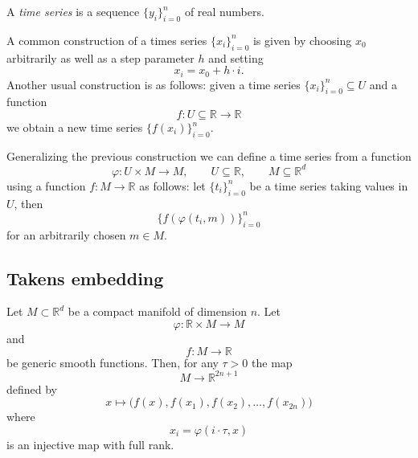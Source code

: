 \documentclass{amsart}
\begin{document}
	A \textit{time series} is a sequence $\{y_i\}_{i = 0}^n$ of real numbers. 
	
	A common construction of a times series $\{x_i\}_{i = 0}^n$ is given by choosing $x_0$ arbitrarily as well as a step parameter $h$ and setting
	\begin{equation*}
	x_i = x_0 + h\cdot i.
	\end{equation*}
	Another usual construction is as follows: given a time series $\{x_i\}_{i = 0}^n \subseteq U$ and a function
	\begin{equation*}
	f : U \subseteq \mathbb R \to \mathbb R
	\end{equation*}
	we obtain a new time series $\{f(x_i)\}_{i = 0}^n$.
	
	Generalizing the previous construction we can define a time series from a function 
	\begin{equation*}
	\varphi : U \times M \to M, \qquad U \subseteq \mathbb R, \qquad M \subseteq \mathbb R^d
	\end{equation*} 
	using a function $f : M \to \mathbb R$ as follows: let $\{t_i\}_{i=0}^n$ be a time series taking values in $U$, then
	\begin{equation*}
	\{f(\varphi(t_i, m))\}_{i=0}^n
	\end{equation*}
	for an arbitrarily chosen $m \in M$.
	
	\subsection*{Takens embedding}	\label{takens_embedding}
	
	Let $M \subset \mathbb R^d$ be a 
	compact manifold of dimension $n$. Let
	\begin{equation*}
	\varphi : \mathbb R \times M \to M
	\end{equation*} 
	and
	\begin{equation*}
	f : M \to \mathbb R
	\end{equation*}
	be generic smooth functions. Then, for any $\tau > 0$ the map
	\begin{equation*}
	M \to \mathbb R^{2n+1}
	\end{equation*}
	defined by
	\begin{equation*}
	x \mapsto\big( f(x), f(x_1), f(x_2), \dots, f(x_{2n}) \big)
	\end{equation*}
	where 
	\begin{equation*}
	x_i = \varphi(i \cdot \tau, x)
	\end{equation*}
	is an injective map with full rank.
	
\end{document}
